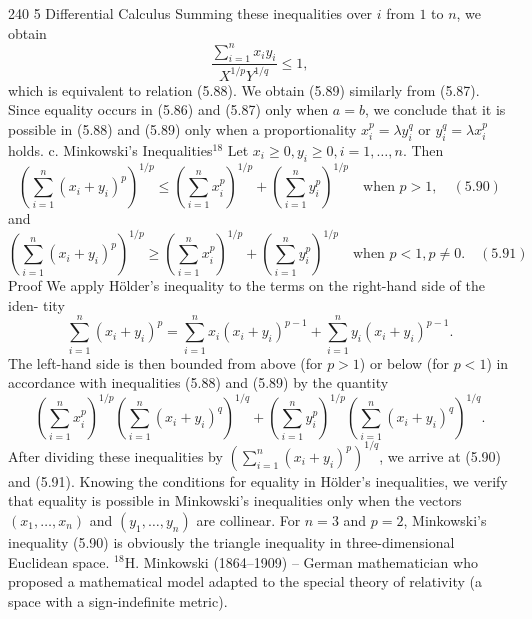 240
5 Differential Calculus
Summing these inequalities over $i$ from $1$ to $n$, we obtain
$$ \frac{\sum_{i=1}^n x_i y_i}{X^{1/p}Y^{1/q}} \le 1, $$
which is equivalent to relation (5.88).
We obtain (5.89) similarly from (5.87). Since equality occurs in (5.86) and (5.87)
only when $a = b$, we conclude that it is possible in (5.88) and (5.89) only when a
proportionality $x_i^p = \lambda y_i^q$ or $y_i^q = \lambda x_i^p$ holds.
c. Minkowski's Inequalities$^{18}$
Let $x_i \ge 0, y_i \ge 0, i = 1, \dots, n$. Then
$$ \left(\sum_{i=1}^n (x_i + y_i)^p\right)^{1/p} \le \left(\sum_{i=1}^n x_i^p\right)^{1/p} + \left(\sum_{i=1}^n y_i^p\right)^{1/p} \quad \text{when } p > 1, \quad (5.90) $$
and
$$ \left(\sum_{i=1}^n (x_i + y_i)^p\right)^{1/p} \ge \left(\sum_{i=1}^n x_i^p\right)^{1/p} + \left(\sum_{i=1}^n y_i^p\right)^{1/p} \quad \text{when } p < 1, p \ne 0. \quad (5.91) $$
Proof We apply Hölder's inequality to the terms on the right-hand side of the iden-
tity
$$ \sum_{i=1}^n (x_i + y_i)^p = \sum_{i=1}^n x_i(x_i + y_i)^{p-1} + \sum_{i=1}^n y_i(x_i + y_i)^{p-1}. $$
The left-hand side is then bounded from above (for $p > 1$) or below (for $p < 1$)
in accordance with inequalities (5.88) and (5.89) by the quantity
$$ \left(\sum_{i=1}^n x_i^p\right)^{1/p} \left(\sum_{i=1}^n (x_i + y_i)^q\right)^{1/q} + \left(\sum_{i=1}^n y_i^p\right)^{1/p} \left(\sum_{i=1}^n (x_i + y_i)^q\right)^{1/q} . $$
After dividing these inequalities by $\left(\sum_{i=1}^n (x_i + y_i)^p\right)^{1/q}$, we arrive at (5.90) and
(5.91).
Knowing the conditions for equality in Hölder's inequalities, we verify that
equality is possible in Minkowski's inequalities only when the vectors $(x_1,\dots,x_n)$
and $(y_1,\dots, y_n)$ are collinear.
For $n = 3$ and $p = 2$, Minkowski's inequality (5.90) is obviously the triangle
inequality in three-dimensional Euclidean space.
$^{18}$H. Minkowski (1864–1909) – German mathematician who proposed a mathematical model
adapted to the special theory of relativity (a space with a sign-indefinite metric).